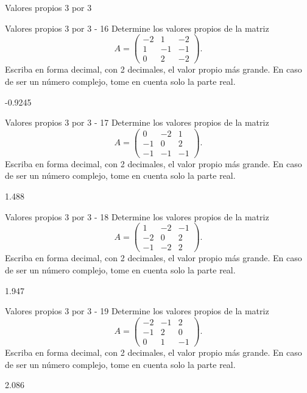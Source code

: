 \documentclass[a4,11pt]{aleph-notas}
\begin{document}
\begin{quiz}{Valores propios 3 por 3}
\begin{numerical}[tolerance=0.01]%
    {Valores propios 3 por 3 - 16}
    Determine los valores propios de la matriz
    \[
    A = \begin{pmatrix}
    -2 & 1 & -2 \\
    1 & -1 & -1 \\
    0 & 2 & -2
    \end{pmatrix}.
    \]
    Escriba en forma decimal, con 2 decimales, el valor propio más grande. En caso de ser un número complejo, tome en cuenta solo la parte real.
    \item[] -0.9245
\end{numerical}

\begin{numerical}[tolerance=0.01]%
    {Valores propios 3 por 3 - 17}
    Determine los valores propios de la matriz
    \[
    A = \begin{pmatrix}
    0 & -2 & 1 \\
    -1 & 0 & 2 \\
    -1 & -1 & -1
    \end{pmatrix}.
    \]
    Escriba en forma decimal, con 2 decimales, el valor propio más grande. En caso de ser un número complejo, tome en cuenta solo la parte real.
    \item[] 1.488
\end{numerical}

\begin{numerical}[tolerance=0.01]%
    {Valores propios 3 por 3 - 18}
    Determine los valores propios de la matriz
    \[
    A = \begin{pmatrix}
    1 & -2 & -1 \\
    -2 & 0 & 2 \\
    -1 & -2 & 2
    \end{pmatrix}.
    \]
    Escriba en forma decimal, con 2 decimales, el valor propio más grande. En caso de ser un número complejo, tome en cuenta solo la parte real.
    \item[] 1.947
\end{numerical}

\begin{numerical}[tolerance=0.01]%
    {Valores propios 3 por 3 - 19}
    Determine los valores propios de la matriz
    \[
    A = \begin{pmatrix}
    -2 & -1 & 2 \\
    -1 & 2 & 0 \\
    0 & 1 & -1
    \end{pmatrix}.
    \]
    Escriba en forma decimal, con 2 decimales, el valor propio más grande. En caso de ser un número complejo, tome en cuenta solo la parte real.
    \item[] 2.086
\end{numerical}


\end{quiz}
\end{document}
